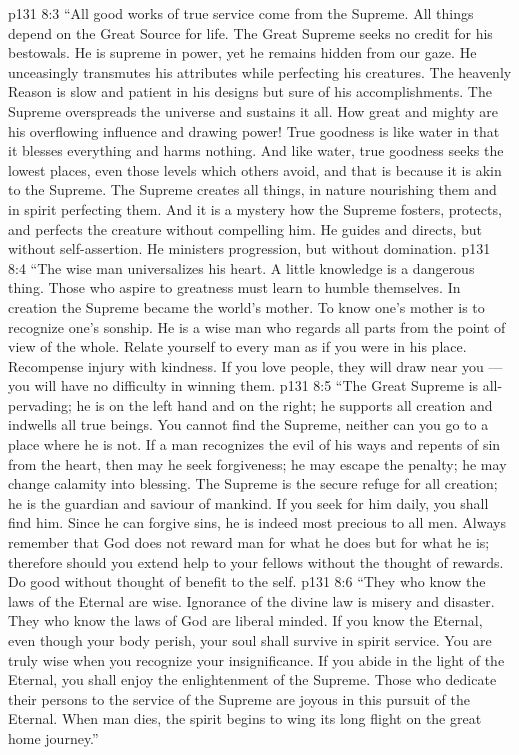 \vs p131 8:3 “All good works of true service come from the Supreme. All things depend on the Great Source for life. The Great Supreme seeks no credit for his bestowals. He is supreme in power, yet he remains hidden from our gaze. He unceasingly transmutes his attributes while perfecting his creatures. The heavenly Reason is slow and patient in his designs but sure of his accomplishments. The Supreme overspreads the universe and sustains it all. How great and mighty are his overflowing influence and drawing power! True goodness is like water in that it blesses everything and harms nothing. And like water, true goodness seeks the lowest places, even those levels which others avoid, and that is because it is akin to the Supreme. The Supreme creates all things, in nature nourishing them and in spirit perfecting them. And it is a mystery how the Supreme fosters, protects, and perfects the creature without compelling him. He guides and directs, but without self\hyp{}assertion. He ministers progression, but without domination.
\vs p131 8:4 “The wise man universalizes his heart. A little knowledge is a dangerous thing. Those who aspire to greatness must learn to humble themselves. In creation the Supreme became the world’s mother. To know one’s mother is to recognize one’s sonship. He is a wise man who regards all parts from the point of view of the whole. Relate yourself to every man as if you were in his place. Recompense injury with kindness. If you love people, they will draw near you --- you will have no difficulty in winning them.
\vs p131 8:5 “The Great Supreme is all\hyp{}pervading; he is on the left hand and on the right; he supports all creation and indwells all true beings. You cannot find the Supreme, neither can you go to a place where he is not. If a man recognizes the evil of his ways and repents of sin from the heart, then may he seek forgiveness; he may escape the penalty; he may change calamity into blessing. The Supreme is the secure refuge for all creation; he is the guardian and saviour of mankind. If you seek for him daily, you shall find him. Since he can forgive sins, he is indeed most precious to all men. Always remember that God does not reward man for what he does but for what he is; therefore should you extend help to your fellows without the thought of rewards. Do good without thought of benefit to the self.
\vs p131 8:6 “They who know the laws of the Eternal are wise. Ignorance of the divine law is misery and disaster. They who know the laws of God are liberal minded. If you know the Eternal, even though your body perish, your soul shall survive in spirit service. You are truly wise when you recognize your insignificance. If you abide in the light of the Eternal, you shall enjoy the enlightenment of the Supreme. Those who dedicate their persons to the service of the Supreme are joyous in this pursuit of the Eternal. When man dies, the spirit begins to wing its long flight on the great home journey.”
